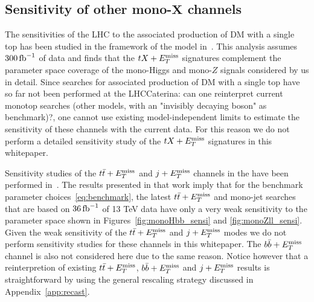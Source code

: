 \subsection[Sensitivity of other mono-$X$ channels]{Sensitivity of other mono-$\bm{X}$ channels}
\label{sec:sensi_others}

The sensitivities of the LHC to the associated production of DM with a single top has been studied in the framework of the \hdma model in~\cite{Pani:2017qyd}. This analysis assumes $300 \, {\rm fb}^{-1}$ of data and finds that the $t X + E_T^\mathrm{miss}$ signatures complement the parameter space coverage of the mono-Higgs and  mono-$Z$ signals considered by us in detail.  Since searches for associated production of DM with a single top have so far not been performed at the LHC\color{red}Caterina: can one reinterpret current monotop searches (other models, with an "invisibly decaying boson" as benchmark)?\color{black}, one cannot use existing model-independent limits to estimate the sensitivity of these channels with the current data. For this reason we do not perform a detailed sensitivity study of the $t X + E_T^\mathrm{miss}$ signatures in this whitepaper.  

Sensitivity studies of the $t \bar t + E_T^\mathrm{miss}$ and $j + E_T^\mathrm{miss}$ channels in the \hdma have been performed in~\cite{Bauer:2017ota}. The results presented in that work imply that for the benchmark parameter choices~\eqref{eq:benchmark}, the latest  $t \bar t + E_T^\mathrm{miss}$ and  mono-jet searches that are based on $36 \, {\rm fb}^{-1}$ of 13 TeV data have  only a very weak sensitivity to the parameter space shown in Figures~\ref{fig:monoHbb_sensi} and \ref{fig:monoZll_sensi}. Given the weak sensitivity of the $t \bar t + E_T^\mathrm{miss}$ and $j + E_T^\mathrm{miss}$ modes we do not perform sensitivity studies for these channels in this whitepaper. The $b \bar b + E_T^\mathrm{miss}$ channel is also not considered here due to the same reason. Notice however that a reinterpretion of existing $t \bar t + E_T^\mathrm{miss}$, $b \bar b + E_T^\mathrm{miss}$ and $j + E_T^\mathrm{miss}$ results is straightforward by using the general rescaling strategy discussed in Appendix~\ref{app:recast}. 










